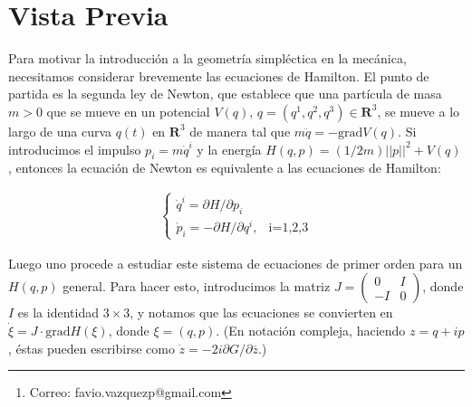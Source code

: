 \documentclass[a4paper,10pt]{article}
\author{Favio Vázquez\thanks{Correo: favio.vazquezp@gmail.com}}\affil{Instituto de Ciencias Nucleares. Universidad Nacional Autónoma de México.}
\date{}
\numberwithin{equation}{section}
\newcommand{\grad}{\text{grad}}
\begin{document}
\makeatletter
\def\@maketitle{%
  \newpage
  \null
  \vskip 2em%
  \begin{center}%
  \let \footnote \thanks
    {\Large\bfseries \@title \par}%
    \vskip 1.5em%
    {\normalsize
      \lineskip .5em%
      \begin{tabular}[t]{c}%
        \@author
      \end{tabular}\par}%
    \vskip 1em%
    {\normalsize \@date}%
  \end{center}%
  \par
  \vskip 1.5em}
\makeatother

\maketitle

\section*{Vista Previa}

\vspace{3cm}

Para motivar la introducción a la geometría simpléctica en la mecánica, necesitamos 
considerar brevemente las ecuaciones de Hamilton. El punto de partida es la segunda 
ley de Newton, que establece que una partícula de masa $m > 0$ que se mueve en un 
potencial $V(q)$, $q=(q^1,q^2,q^3) \in \mathbf{R}^3$, se mueve a lo largo de una 
curva $q(t)$ en $\mathbf{R}^3$ de manera tal que $m\ddot{q} = - \grad{V(q)}$. Si 
introducimos el impulso $p_i = m\dot{q}^i$ y la energía $H(q,p) = (1/2m)||p||^2 + V(q)$,
entonces la ecuación de Newton es equivalente a las ecuaciones de Hamilton:

\begin{align*}
 \begin{cases}
  \dot{q}^i = \partial H/\partial p_i \\
  \dot{p}_i = - \partial H/\partial q^i,          & \text{i=1,2,3}
\end{cases}
\end{align*}

Luego uno procede a estudiar este sistema de ecuaciones de primer orden para un $H(q,p)$ 
general. Para hacer esto, introducimos la matriz $J = \begin{pmatrix} 0 & I \\ -I & 0\end{pmatrix}$, 
donde $I$ es la identidad $3\times 3$, y notamos que las ecuaciones se convierten en 
$\dot{\xi} = J\cdot \grad H(\xi)$, donde $\xi = (q,p)$. (En notación compleja, 
haciendo $z=q+ip$, éstas pueden escribirse como $\dot{z} = -2i\partial G/\partial\overline{z}$.)
\end{document}
